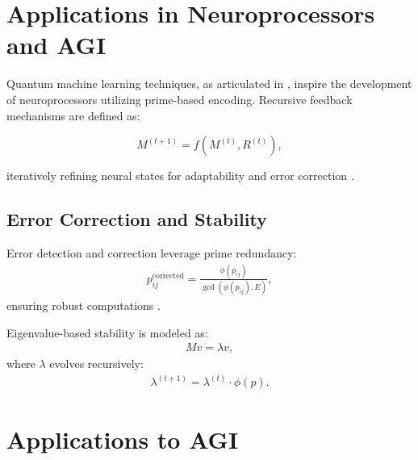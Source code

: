 \documentclass{article}
\theoremstyle{plain}
\begin{document}
\section{Applications in Neuroprocessors and AGI}

Quantum machine learning techniques, as articulated in \cite{Biamonte2017}, inspire the development of neuroprocessors utilizing prime-based encoding. Recursive feedback mechanisms are defined as:

\begin{equation}
M^{(t+1)} = f(M^{(t)}, R^{(t)}),
\end{equation}

iteratively refining neural states for adaptability and error correction \cite{Chalmers1995, Varela1991}.


\subsection{Error Correction and Stability}
Error detection and correction leverage prime redundancy:
\begin{equation}
\begin{aligned}
p^{\text{corrected}}_{ij} = \frac{\phi(p_{ij})}{\gcd(\phi(p_{ij}), E)},
\end{aligned}
\end{equation}
ensuring robust computations \cite{Hinton2006}.

Eigenvalue-based stability is modeled as:
\begin{equation}
\begin{aligned}
Mv = \lambda v,
\end{aligned}
\end{equation}
where $\lambda$ evolves recursively:
\begin{equation}
\begin{aligned}
\lambda^{(t+1)} = \lambda^{(t)} \cdot \phi(p).
\end{aligned}
\end{equation}

\section{Applications to AGI}
\end{document}
